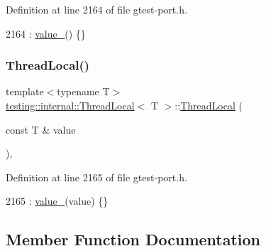 Definition at line 2164 of file gtest-\/port.\+h.


\begin{DoxyCode}
2164 : \hyperlink{classtesting_1_1internal_1_1ThreadLocal_ae0db6b57bdb752feb343ee4d935708e2}{value\_}() \{\}
\end{DoxyCode}
\mbox{\label{classtesting_1_1internal_1_1ThreadLocal_a85610bdfdbc93a4c56215e0aad7da870}} 
\subsubsection{\texorpdfstring{Thread\+Local()}{ThreadLocal()}\hspace{0.1cm}{\footnotesize\ttfamily [2/2]}}
{\footnotesize\ttfamily template$<$typename T$>$ \\
\hyperlink{classtesting_1_1internal_1_1ThreadLocal}{testing\+::internal\+::\+Thread\+Local}$<$ T $>$\+::\hyperlink{classtesting_1_1internal_1_1ThreadLocal}{Thread\+Local} (\begin{DoxyParamCaption}\item[{const T \&}]{value }\end{DoxyParamCaption})\hspace{0.3cm}{\ttfamily [inline]}, {\ttfamily [explicit]}}



Definition at line 2165 of file gtest-\/port.\+h.


\begin{DoxyCode}
2165 : \hyperlink{classtesting_1_1internal_1_1ThreadLocal_ae0db6b57bdb752feb343ee4d935708e2}{value\_}(value) \{\}
\end{DoxyCode}


\subsection{Member Function Documentation}
\mbox{\label{classtesting_1_1internal_1_1ThreadLocal_ac56aeb97991824979bf192c63d1466f8}} 
